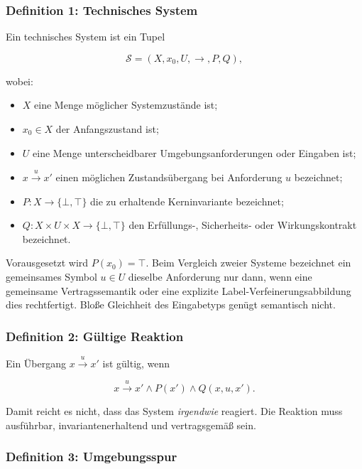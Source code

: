 \documentclass[
  10pt,
  a4paper,
]{article}
\providecommand{\tightlist}{%
  \setlength{\itemsep}{0pt}\setlength{\parskip}{0pt}}
\begin{document}
\hypertarget{definition-1-technisches-system}{%
\subsubsection{Definition 1: Technisches
System}\label{definition-1-technisches-system}}

Ein technisches System ist ein Tupel

\[
\mathcal S=(X,x_0,U,\longrightarrow,P,Q),
\]

wobei:

\begin{itemize}
\tightlist
\item
  \(X\) eine Menge möglicher Systemzustände ist;
\item
  \(x_0\in X\) der Anfangszustand ist;
\item
  \(U\) eine Menge unterscheidbarer Umgebungsanforderungen oder Eingaben
  ist;
\item
  \(x\xrightarrow{u}x'\) einen möglichen Zustandsübergang bei
  Anforderung \(u\) bezeichnet;
\item
  \(P:X\to\{\bot,\top\}\) die zu erhaltende Kerninvariante bezeichnet;
\item
  \(Q:X\times U\times X\to\{\bot,\top\}\) den Erfüllungs-, Sicherheits-
  oder Wirkungskontrakt bezeichnet.
\end{itemize}

Vorausgesetzt wird \(P(x_0)=\top\). Beim Vergleich zweier Systeme
bezeichnet ein gemeinsames Symbol \(u\in U\) dieselbe Anforderung nur
dann, wenn eine gemeinsame Vertragssemantik oder eine explizite
Label-Verfeinerungsabbildung dies rechtfertigt. Bloße Gleichheit des
Eingabetyps genügt semantisch nicht.

\hypertarget{definition-2-guxfcltige-reaktion}{%
\subsubsection{Definition 2: Gültige
Reaktion}\label{definition-2-guxfcltige-reaktion}}

Ein Übergang \(x\xrightarrow{u}x'\) ist gültig, wenn

\[
x\xrightarrow{u}x'
\land P(x')
\land Q(x,u,x').
\]

Damit reicht es nicht, dass das System \emph{irgendwie} reagiert. Die
Reaktion muss ausführbar, invariantenerhaltend und vertragsgemäß sein.

\hypertarget{definition-3-umgebungsspur}{%
\subsubsection{Definition 3:
Umgebungsspur}\label{definition-3-umgebungsspur}}
\end{document}
